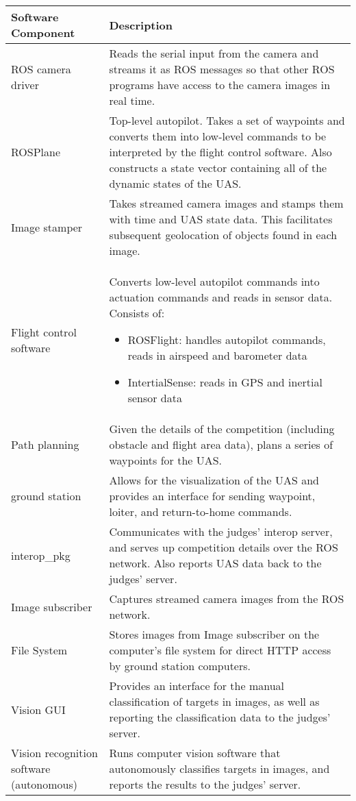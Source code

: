 \documentclass[]{auvsi_doc}
\begin{document}
\newpage
\vspace*{-1.25cm}
\begin{center}
	
	\centering
	\bgroup
	\def\arraystretch{1.25}%
	\begin{tabular}{ P{5cm}P{10cm} }
		\hline
		\textbf{Software Component} 	& \textbf{Description} \\
		\hline
		ROS camera driver & Reads the serial input from the camera and streams it as ROS messages so that other ROS programs have access to the camera images in real time.  \\
		ROSPlane & Top-level autopilot. Takes a set of waypoints and converts them into low-level commands to be interpreted by the flight control software. Also constructs a state vector containing all of the dynamic states of the UAS. \\
		Image stamper & Takes streamed camera images and stamps them with time and UAS state data. This facilitates subsequent geolocation of objects found in each image.  \\
		Flight control software & Converts low-level autopilot commands into actuation commands and reads in sensor data. Consists of: \begin{itemize} \item ROSFlight: handles autopilot commands, reads in airspeed and barometer data
		\item IntertialSense: reads in GPS and inertial sensor data \end{itemize}  \\[-0.5cm]
		Path planning & Given the details of the competition (including obstacle and flight area data), plans a series of waypoints for the UAS. \\
		ground station & Allows for the visualization of the UAS and provides an interface for sending waypoint, loiter, and return-to-home commands.  \\
		interop\_pkg & Communicates with the judges' interop server, and serves up competition details over the ROS network. Also reports UAS data back to the judges' server. \\
		Image subscriber & Captures streamed camera images from the ROS network. \\
		File System & Stores images from Image subscriber on the computer's file system for direct HTTP access by ground station computers.  \\
		Vision GUI & Provides an interface for the manual classification of targets in images, as well as reporting the classification data to the judges' server.  \\
		Vision recognition software (autonomous) & Runs computer vision software that autonomously classifies targets in images, and reports the results to the judges' server. \\
		\hline
	\end{tabular}
	\egroup
	\label{table:comp-des}
\end{center}
\end{document}
